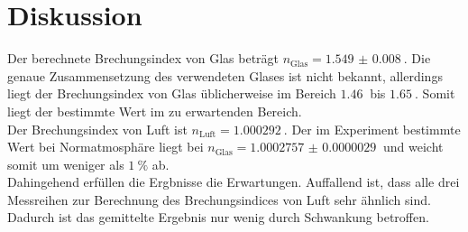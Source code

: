 \section{Diskussion}
\label{sec:Diskussion}

Der berechnete Brechungsindex von Glas beträgt $n_\text{Glas} = \qty{1.549(8)}{}$.
Die genaue Zusammensetzung des verwendeten Glases ist nicht bekannt, allerdings liegt der Brechungsindex von Glas üblicherweise im Bereich $\qty{1.46}{}$ bis $\qty{1.65}{}$. \cite{index}
Somit liegt der bestimmte Wert im zu erwartenden Bereich.
\\
Der Brechungsindex von Luft ist $n_\text{Luft} = \qty{1.000292}{}$. 
Der im Experiment bestimmte Wert bei Normatmosphäre liegt bei $n_\text{Glas} = \qty{1.0002757(29)}{}$ und weicht somit um weniger als $\qty{1}{\percent}$ ab.
\\
Dahingehend erfüllen die Ergbnisse die Erwartungen. 
Auffallend ist, dass alle drei Messreihen zur Berechnung des Brechungsindices von Luft sehr ähnlich sind.
Dadurch ist das gemittelte Ergebnis nur wenig durch Schwankung betroffen.